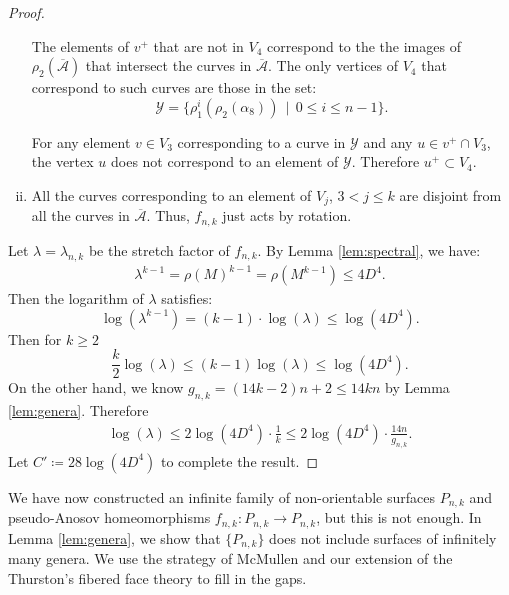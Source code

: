 \begin{proof}
\begin{enumerate}[(i)]
The elements of $v^+$ that are not in $V_4$ correspond to the the images of $\rho_2(\overline{\mathcal{A}})$ that intersect the curves in $\overline{\mathcal{A}}$.
The only vertices of $V_4$ that correspond to such curves are those in the set:
 $$\mathcal{Y}=\{\rho_1^i(\rho_2(\alpha_8))\,\mid\,0\leq i\leq n-1\}.$$ %


  For any element $v \in V_3$ corresponding to a curve in $\mathcal{Y}$ and any
  $u \in v^+ \cap V_3$, the vertex $u$ does not correspond to an element of $\mathcal{Y}$.  Therefore $u^+ \subset V_4$.
\item All the curves corresponding to an element of $V_j$, $3 < j \leq k$ are disjoint from all the curves in
  $\overline{\mathcal{A}}$. Thus, $f_{n,k}$ just acts by rotation.
\end{enumerate}

Let $\lambda = \lambda_{n,k}$ be the stretch factor of $f_{n,k}$.  By Lemma \ref{lem:spectral}, we have:
\begin{gather*}
    \lambda^{k-1} = \rho(M)^{k-1} = \rho(M^{k-1}) \leq 4D^4.
\end{gather*}
Then the logarithm of $\lambda$ satisfies:
$$\log(\lambda^{k-1})=(k-1)\cdot \log(\lambda) \leq \log(4D^4).$$
Then for $k\geq 2$
    $$\frac{k}{2}\log(\lambda) \leq (k-1)\log(\lambda) \leq \log(4D^4).$$
On the other hand, we know $g_{n,k} = (14k - 2)n + 2 \leq 14kn$ by Lemma \ref{lem:genera}. Therefore
\begin{align*}
    \log(\lambda) \leq 2\log(4D^4)\cdot\frac{1}{k} \leq 2\log(4D^4)\cdot \frac{14n}{g_{n,k}}.
\end{align*}
Let $C' \coloneqq 28\log(4D^4)$ to complete the result.
\end{proof}


We have now constructed an infinite family of non-orientable surfaces $P_{n,k}$ and pseudo-Anosov homeomorphisms $f_{n,k}:P_{n,k}\to P_{n,k}$, but this is not
enough. In Lemma \ref{lem:genera}, we show that $\{P_{n,k}\}$ does not include surfaces of infinitely many genera. We use the strategy of McMullen \cite{mcmullen2000polynomial} and our extension of the Thurston's
fibered face theory to fill in the gaps. %

